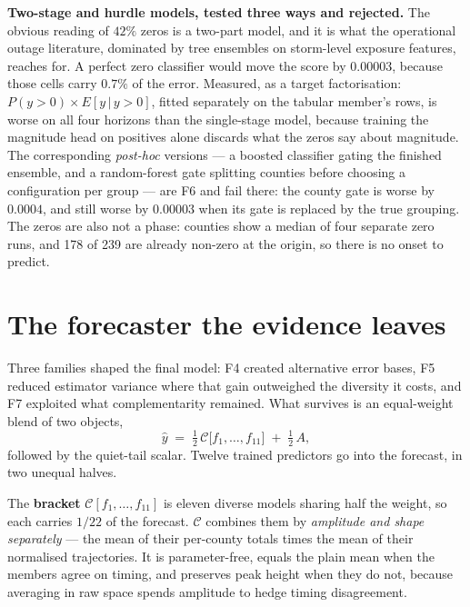 \documentclass[10pt,letterpaper,twocolumn]{article}
\begin{document}
\textbf{Two-stage and hurdle models, tested three ways and rejected.} The
obvious reading of $42\%$ zeros is a two-part model, and it is what the
operational outage literature, dominated by tree ensembles on storm-level
exposure features, reaches for. A perfect zero classifier would move the score
by $0.00003$, because those cells carry $0.7\%$ of the error. Measured, as a target
factorisation: $P(y{>}0) \times E[y\,|\,y{>}0]$, fitted separately on the
tabular member's rows, is worse on all four horizons than the single-stage
model, because training the magnitude head on positives alone discards what the
zeros say about magnitude. The corresponding \emph{post-hoc} versions --- a
boosted classifier gating the finished ensemble, and a random-forest gate
splitting counties before choosing a configuration per group --- are F6 and fail
there: the county gate is worse by $0.0004$, and still worse by $0.00003$ when
its gate is replaced by the true grouping. The zeros are also not a phase: counties show a median of four separate zero runs, and 178 of 239 are
already non-zero at the origin, so there is no onset to predict.

\section{The forecaster the evidence leaves}
\label{sec:model}

Three families shaped the final model: F4 created alternative error bases, F5
reduced estimator variance where that gain outweighed the diversity it costs,
and F7 exploited what complementarity remained. What survives is an equal-weight
blend of two objects,
\[
\hat{y} \;=\; \tfrac{1}{2}\,\mathcal{C}\big[f_1,\dots,f_{11}\big]
\;+\; \tfrac{1}{2}\,A ,
\]
followed by the quiet-tail scalar. Twelve trained predictors go into the
forecast, in two unequal halves.

The \textbf{bracket} $\mathcal{C}[f_1,\dots,f_{11}]$ is eleven diverse models
sharing half the weight, so each carries $1/22$ of the forecast. $\mathcal{C}$
combines them by \emph{amplitude and shape separately} --- the mean of their
per-county totals times the mean of their normalised trajectories. It is
parameter-free, equals the plain mean when the members agree on timing, and
preserves peak height when they do not, because averaging in raw space spends
amplitude to hedge timing disagreement.
\end{document}
